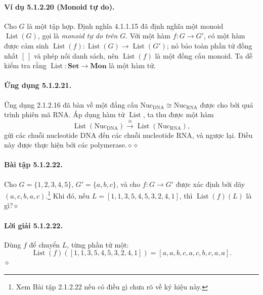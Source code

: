 \paragraph{Ví dụ 5.1.2.20 (Monoid tự do).} Cho $G$ là một tập hợp. Định nghĩa 4.1.1.15 đã định nghĩa một monoid $\operatorname{List}(G)$, gọi là \emph{monoid tự do trên $G$}. Với một hàm $f:G\to G'$, có một hàm được cảm sinh $\operatorname{List}(f):\operatorname{List}(G)\to\operatorname{List}(G')$; nó bảo toàn phần tử đồng nhất $[\ ]$ và phép nối danh sách, nên $\operatorname{List}(f)$ là một đồng cấu monoid. Ta dễ kiểm tra rằng $\operatorname{List}:\mathbf{Set}\to\mathbf{Mon}$ là một hàm tử.
\paragraph{Ứng dụng 5.1.2.21.} Ứng dụng 2.1.2.16 đã bàn về một đẳng cấu $\mathrm{Nuc}_{\mathrm{DNA}}\cong\mathrm{Nuc}_{\mathrm{RNA}}$ được cho bởi quá trình phiên mã RNA. Áp dụng hàm tử $\operatorname{List}$, ta thu được một hàm
\[\operatorname{List}(\mathrm{Nuc}_{\mathrm{DNA}})\xrightarrow{\cong}\operatorname{List}(\mathrm{Nuc}_{\mathrm{RNA}}),\]
gửi các chuỗi nucleotide DNA đến các chuỗi nucleotide RNA, và ngược lại. Điều này được thực hiện bởi các polymerase.\hfill$\diamond\diamond$
\paragraph{Bài tập 5.1.2.22.} Cho $G=\{1,2,3,4,5\}$, $G'=\{a,b,c\}$, và cho $f:G\to G'$ được xác định bởi dãy $(a,c,b,a,c)$.\footnote{Xem Bài tập 2.1.2.22 nếu có điều gì chưa rõ về ký hiệu này.} Khi đó, nếu $L=[1,1,3,5,4,5,3,2,4,1]$, thì $\operatorname{List}(f)(L)$ là gì?\hfill$\diamond$
\paragraph{Lời giải 5.1.2.22.} Dùng $f$ để chuyển $L$, từng phần tử một:
\[\operatorname{List}(f)([1,1,3,5,4,5,3,2,4,1])=[a,a,b,c,a,c,b,c,a,a].\]\hfill$\diamond$
